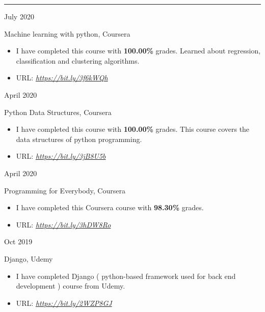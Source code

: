 \documentclass[a4paper,10pt]{article}
\newlength{\cvcolumngapwidth}
\newlength{\cvleftcolumnwidth}
\newlength{\cvrightcolumnwidth}
\newcommand{\cvsectionstyle}[1]{{\normalsize\cvsectionfont\textcolor{cvsectioncolor}{#1}}}
\newcommand{\cvtitlestyle}[1]{{\large\cvtitlefont\textcolor{cvtitlecolor}{#1}}}
\newcommand{\cvdurationstyle}[1]{{\small\cvdurationfont\textcolor{cvdurationcolor}{#1}}}
\newlength{\cvafteritemskipamount}
\newlength{\cvaftersectionskipamount}
\newlength{\cvaftertitleskipamount}
\newlength{\cvparskip}
\newcommand{\cvsection}[1]{
    \begin{minipage}[t]{\cvleftcolumnwidth}
        \raggedleft\cvsectionstyle{#1}
    \end{minipage}%
    \hspace{\cvcolumngapwidth}%
    \begin{minipage}[t]{\cvrightcolumnwidth}
        \textcolor{cvrulecolor}{\rule{\cvrightcolumnwidth}{0.3mm}}
    \end{minipage}

    \vspace{\cvaftersectionskipamount}
}
\newcommand{\cvitem}[2]{
    \begin{minipage}[t]{\cvleftcolumnwidth}
        \raggedleft #1
    \end{minipage}%
    \hspace{\cvcolumngapwidth}%
    \begin{minipage}[t]{\cvrightcolumnwidth}
        \setlength{\parskip}{\cvparskip} #2
    \end{minipage}

    \vspace{\cvafteritemskipamount}
}
\newcommand{\cvtitle}[1]{
    \cvtitlestyle{#1}

    \vspace{\cvaftertitleskipamount}
    \vspace{-\cvparskip}
}
\begin{document}
\cvsection{CERTIFICATIONS}

\cvitem{
    \cvdurationstyle{July 2020}
}{
    \cvtitle{Machine learning with python, Coursera}


    \begin{itemize}[leftmargin=*]
         \item I have completed this course with \textbf{100.00\%} grades. Learned about regression, classification and clustering algorithms.
        \item URL: 
        \textit{\href{https://www.coursera.org/account/accomplishments/certificate/T4ZNVF93GQF8}{https://bit.ly/3f6kWQh}}
    \end{itemize}
}

\cvitem{
    \cvdurationstyle{April 2020}
}{
    \cvtitle{Python Data Structures, Coursera}


    \begin{itemize}[leftmargin=*]
         \item I have completed this course with \textbf{100.00\%} grades. This course covers the data structures of
         python programming.
        \item URL:
       \textit{\href{https://www.coursera.org/account/accomplishments/certificate/AKZ5LTN9JV5L}{https://bit.ly/3jB8U5b}}
    \end{itemize}
}


\cvitem{
    \cvdurationstyle{April 2020}
}{
    \cvtitle{Programming for Everybody, Coursera}


    \begin{itemize}[leftmargin=*]
         \item I have completed this Coursera course with \textbf{98.30\%} grades.
        \item URL:
        \textit{\href{https://www.coursera.org/account/accomplishments/certificate/7APPEQDNGXJX}{https://bit.ly/3hDW8Ro}}
        
    \end{itemize}
}


\cvitem{
    \cvdurationstyle{Oct 2019}
}{
    \cvtitle{Django, Udemy}


    \begin{itemize}[leftmargin=*]
         \item I have completed Django ( python-based framework
used for back end development ) course from Udemy.
        \item URL:
        \textit{\href{https://www.udemy.com/certificate/UC-IOQDAJNX/}{https://bit.ly/2WZP8GJ}}
        
    \end{itemize}
}
\end{document}
